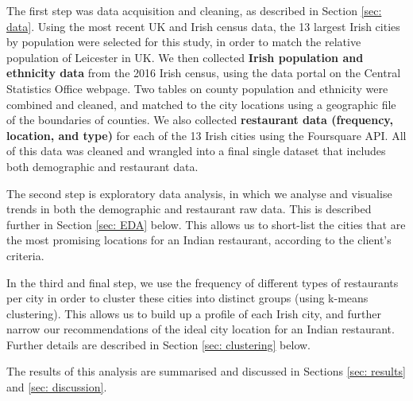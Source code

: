 \documentclass[a4paper,11pt]{article}
\begin{document}
The first step was data acquisition and cleaning, as described in Section \ref{sec: data}. Using the most recent UK and Irish census data, the 13 largest Irish cities by population were selected for this study, in order to match the relative population of Leicester in UK. We then collected \textbf{Irish population and ethnicity data} from the 2016 Irish census, using the data portal on the Central Statistics Office webpage. Two tables on county population and ethnicity were combined and cleaned, and matched to the city locations using a geographic file of the boundaries of counties. We also collected \textbf{restaurant data (frequency, location, and type)} for each of the 13 Irish cities using the Foursquare API. All of this data was cleaned and wrangled into a final single dataset that includes both demographic and restaurant data. %

The second step is exploratory data analysis, in which we analyse and visualise trends in both the demographic and restaurant raw data. This is described further in Section \ref{sec: EDA} below. This allows us to short-list the cities that are the most promising locations for an Indian restaurant, according to the client's criteria.

In the third and final step, we use the frequency of different types of restaurants per city in order to cluster these cities into distinct groups (using k-means clustering). This allows us to build up a profile of each Irish city, and further narrow our recommendations of the ideal city location for an Indian restaurant. Further details are described in Section \ref{sec: clustering} below.

The results of this analysis are summarised and discussed in Sections \ref{sec: results} and \ref{sec: discussion}.
\end{document}
